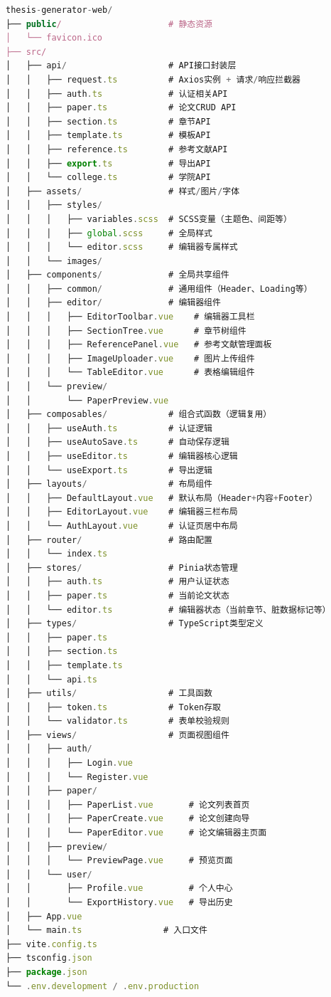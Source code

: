 \begin{lstlisting}[language=JavaScript]
thesis-generator-web/
├── public/                     # 静态资源
│   └── favicon.ico
├── src/
│   ├── api/                    # API接口封装层
│   │   ├── request.ts          # Axios实例 + 请求/响应拦截器
│   │   ├── auth.ts             # 认证相关API
│   │   ├── paper.ts            # 论文CRUD API
│   │   ├── section.ts          # 章节API
│   │   ├── template.ts         # 模板API
│   │   ├── reference.ts        # 参考文献API
│   │   ├── export.ts           # 导出API
│   │   └── college.ts          # 学院API
│   ├── assets/                 # 样式/图片/字体
│   │   ├── styles/
│   │   │   ├── variables.scss  # SCSS变量（主题色、间距等）
│   │   │   ├── global.scss     # 全局样式
│   │   │   └── editor.scss     # 编辑器专属样式
│   │   └── images/
│   ├── components/             # 全局共享组件
│   │   ├── common/             # 通用组件（Header、Loading等）
│   │   ├── editor/             # 编辑器组件
│   │   │   ├── EditorToolbar.vue    # 编辑器工具栏
│   │   │   ├── SectionTree.vue      # 章节树组件
│   │   │   ├── ReferencePanel.vue   # 参考文献管理面板
│   │   │   ├── ImageUploader.vue    # 图片上传组件
│   │   │   └── TableEditor.vue      # 表格编辑组件
│   │   └── preview/
│   │       └── PaperPreview.vue
│   ├── composables/            # 组合式函数（逻辑复用）
│   │   ├── useAuth.ts          # 认证逻辑
│   │   ├── useAutoSave.ts      # 自动保存逻辑
│   │   ├── useEditor.ts        # 编辑器核心逻辑
│   │   └── useExport.ts        # 导出逻辑
│   ├── layouts/                # 布局组件
│   │   ├── DefaultLayout.vue   # 默认布局（Header+内容+Footer）
│   │   ├── EditorLayout.vue    # 编辑器三栏布局
│   │   └── AuthLayout.vue      # 认证页居中布局
│   ├── router/                 # 路由配置
│   │   └── index.ts
│   ├── stores/                 # Pinia状态管理
│   │   ├── auth.ts             # 用户认证状态
│   │   ├── paper.ts            # 当前论文状态
│   │   └── editor.ts           # 编辑器状态（当前章节、脏数据标记等）
│   ├── types/                  # TypeScript类型定义
│   │   ├── paper.ts
│   │   ├── section.ts
│   │   ├── template.ts
│   │   └── api.ts
│   ├── utils/                  # 工具函数
│   │   ├── token.ts            # Token存取
│   │   └── validator.ts        # 表单校验规则
│   ├── views/                  # 页面视图组件
│   │   ├── auth/
│   │   │   ├── Login.vue
│   │   │   └── Register.vue
│   │   ├── paper/
│   │   │   ├── PaperList.vue       # 论文列表首页
│   │   │   ├── PaperCreate.vue     # 论文创建向导
│   │   │   └── PaperEditor.vue     # 论文编辑器主页面
│   │   ├── preview/
│   │   │   └── PreviewPage.vue     # 预览页面
│   │   └── user/
│   │       ├── Profile.vue         # 个人中心
│   │       └── ExportHistory.vue   # 导出历史
│   ├── App.vue
│   └── main.ts                # 入口文件
├── vite.config.ts
├── tsconfig.json
├── package.json
└── .env.development / .env.production
\end{lstlisting}


